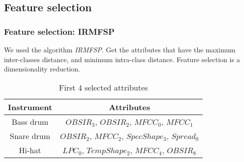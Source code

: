 \documentclass{beamer}
\begin{document}
    \subsection{Feature selection}
    \begin{frame}
        \frametitle{Feature selection: IRMFSP}
        We used the algorithm \emph{IRMFSP}. Get the attributes that have the maximum inter-classes distance, and minimum intra-class distance. Feature selection is a dimensionality reduction.
        \begin{center}
        \begin{table}
        \caption{First 4 selected attributes}
        \begin{tabular}{|c|c|}
        \hline
        Instrument&Attributes\\
        \hline
        Bass drum&$OBSIR_3$, $OBSIR_2$, $MFCC_0$, $MFCC_1$\\
        \hline
        Snare drum&$OBSIR_2$, $MFCC_2$, $SpecShape_3$, $Spread_0$\\
        \hline
        Hi-hat&$LPC_0$, $TempShape_2$, $MFCC_4$, $OBSIR_8$\\
        \hline
        \end{tabular}
        \end{table}
        \end{center}
    \end{frame}
\end{document}
